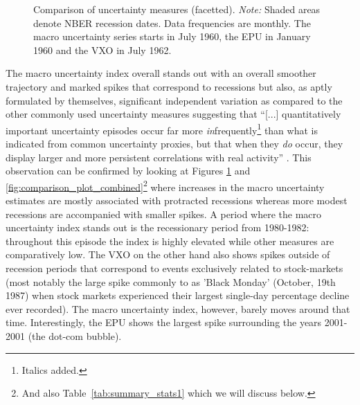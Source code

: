 \documentclass[a4paper,11pt,listof=nochaptergap,oneside,pointednumbers,bibtotoc,bigheadings,liststotoc]{scrbook}
\theoremstyle{mysatz}
\theoremstyle{mydefinition}
\theoremstyle{mytheorem}
\theoremstyle{mybemerkung}
\begin{document}
\begin{figure}[!ht]
   \centering
   \setlength\fboxsep{0pt}
   \setlength\fboxrule{0pt}
      \caption[Comparison of uncertainty measures (facetted).]{Comparison of uncertainty measures (facetted).
      \textit{Note:} Shaded areas denote NBER recession dates. Data frequencies are monthly. The macro uncertainty series starts in July 1960, the EPU in January 1960 and the VXO in July 1962.}   \label{fig:comparison_plot}
\end{figure}


The macro uncertainty index overall stands out with an overall smoother trajectory and marked spikes that correspond to recessions but also, as aptly formulated by \citet{juradoetal:15} themselves, significant independent variation as compared to the other commonly used uncertainty measures suggesting that ``[...] quantitatively important uncertainty episodes occur far more \textit{in}frequently\footnote{Italics added.} than what is indicated from common uncertainty proxies, but that when they \textit{do} occur, they display larger and more persistent correlations with real activity'' \citep[p. 1181]{juradoetal:15}. This observation can be confirmed by looking at Figures \ref{fig:comparison_plot} and \ref{fig:comparison_plot_combined}\footnote{And also Table~\ref{tab:summary_stats1} which we will discuss below.} where increases in the macro uncertainty estimates are mostly associated with protracted recessions whereas more modest recessions are accompanied with smaller spikes. A period where the macro uncertainty index stands out is the recessionary period from 1980-1982: throughout this episode the index is highly elevated while other measures are comparatively low. The VXO on the other hand also shows spikes outside of recession periods that correspond to events exclusively related to stock-markets (most notably the large spike commonly to as 'Black Monday' (October, 19th 1987) when stock markets experienced their largest single-day percentage decline ever recorded). The macro uncertainty index, however, barely moves around that time. Interestingly, the EPU shows the largest spike surrounding the years 2001-2001 (the dot-com bubble). 
\end{document}
